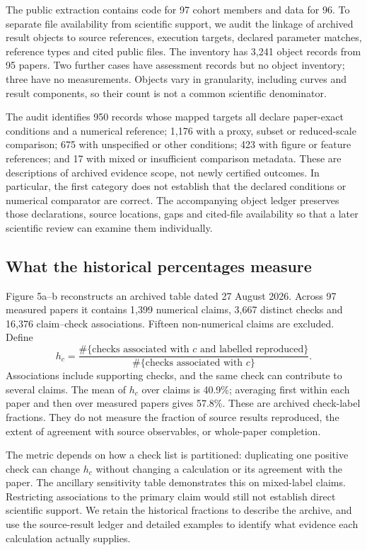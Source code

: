 \documentclass[10pt,a4paper]{article}
\begin{document}
The public extraction contains code for 97 cohort members and data for
96. To separate file availability from scientific support, we audit the
linkage of archived result objects to source references, execution
targets, declared parameter matches, reference types and cited public
files. The inventory has 3,241 object records from 95 papers. Two
further cases have assessment records but no object inventory; three
have no measurements. Objects vary in granularity, including curves and
result components, so their count is not a common scientific
denominator.

The audit identifies 950 records whose mapped targets all declare
paper-exact conditions and a numerical reference; 1,176 with a proxy,
subset or reduced-scale comparison; 675 with unspecified or other
conditions; 423 with figure or feature references; and 17 with mixed or
insufficient comparison metadata. These are descriptions of archived
evidence scope, not newly certified outcomes. In particular, the first
category does not establish that the declared conditions or numerical
comparator are correct. The accompanying object ledger preserves those
declarations, source locations, gaps and cited-file availability so that
a later scientific review can examine them individually.

\subsection{What the historical percentages
measure}\label{what-the-historical-percentages-measure}

Figure 5a--b reconstructs an archived table dated 27 August 2026. Across
97 measured papers it contains 1,399 numerical claims, 3,667 distinct
checks and 16,376 claim--check associations. Fifteen non-numerical
claims are excluded. Define \[
h_c=\frac{\#\{\text{checks associated with }c\text{ and labelled reproduced}\}}
{\#\{\text{checks associated with }c\}}.
\] Associations include supporting checks, and the same check can
contribute to several claims. The mean of \(h_c\) over claims is 40.9\%;
averaging first within each paper and then over measured papers gives
57.8\%. These are archived check-label fractions. They do not measure
the fraction of source results reproduced, the extent of agreement with
source observables, or whole-paper completion.

The metric depends on how a check list is partitioned: duplicating one
positive check can change \(h_c\) without changing a calculation or its
agreement with the paper. The ancillary sensitivity table demonstrates
this on mixed-label claims. Restricting associations to the primary
claim would still not establish direct scientific support. We retain the
historical fractions to describe the archive, and use the source-result
ledger and detailed examples to identify what evidence each calculation
actually supplies.
\end{document}
